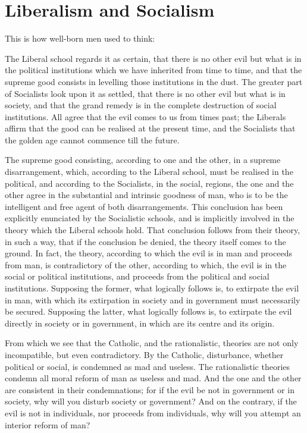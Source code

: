 \section{Liberalism and Socialism}

\label{sec:LiberalismSocialism}

This is how well-born men used to think:

\begin{quotationx}
The Liberal school regards it as certain, that there is no other evil but what is in the political institutions which we have inherited from time to time, and that the supreme good consists in levelling those institutions in the dust. The greater part of Socialists look upon it as settled, that there is no other evil but what is in society, and that the grand remedy is in the complete destruction of social institutions. All agree that the evil comes to us from times past; the Liberals affirm that the good can be realised at the present time, and the Socialists that the golden age cannot commence till the future.

The supreme good consisting, according to one and the other, in a supreme disarrangement, which, according to the Liberal school, must be realised in the political, and according to the Socialists, in the social, regions, the one and the other agree in the substantial and intrinsic goodness of man, who is to be the intelligent and free agent of both disarrangements. This conclusion has been explicitly enunciated by the Socialistic schools, and is implicitly involved in the theory which the Liberal schools hold. That conclusion follows from their theory, in such a way, that if the conclusion be denied, the theory itself comes to the ground. In fact, the theory, according to which the evil is in man and proceeds from man, is contradictory of the other, according to which, the evil is in the social or political institutions, and proceeds from the political and social institutions. Supposing the former, what logically follows is, to extirpate the evil in man, with which its extirpation in society and in government must necessarily be secured. Supposing the latter, what logically follows is, to extirpate the evil directly in society or in government, in which are its centre and its origin.

From which we see that the Catholic, and the rationalistic, theories are not only incompatible, but even contradictory. By the Catholic, disturbance, whether political or social, is condemned as mad and useless. The rationalistic theories condemn all moral reform of man as useless and mad. And the one and the other are consistent in their condemnations; for if the evil be not in government or in society, why will you disturb society or government? And on the contrary, if the evil is not in individuals, nor proceeds from individuals, why will you attempt an interior reform of man?
\end{quotationx}


